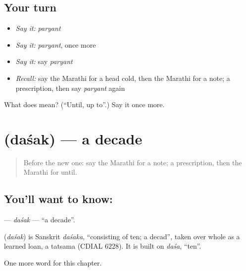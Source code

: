 \subsection*{Your turn}
\begin{itemize}
\raggedright
  \item \emph{Say it:} \emph{paryant}
  \item \emph{Say it:} \emph{paryant}, once more
  \item \emph{Say it:} say \emph{paryant}
  \item \emph{Recall:} say the Marathi for a head cold, then the Marathi for a note; a prescription, then say \emph{paryant} again
\end{itemize}

\begin{tcolorbox}[breakable,colback=teal!4,colframe=teal!35!black,title={Before you move on}]
What does  mean? (\textquotedblleft{}Until, up to\textquotedblright{}.) Say it once more.
\end{tcolorbox}
\section[\texorpdfstring{\mr{दशक} (daśak)}{दशक (daśak)}]{ (daśak) — a decade}

\label{lesson:MR-C201-dasak}



\begin{quote}
Before the new one: say the Marathi for a note; a prescription, then the Marathi for until.
\end{quote}

\subsection*{You'll want to know: }
\textbf{} — \emph{daśak} — \textquotedblleft{}a decade\textquotedblright{}.

\begin{cousinweb}
\textbf{} (\emph{daśak}) is Sanskrit \emph{daśaka}, \textquotedblleft{}consisting of ten; a decad\textquotedblright{}, taken over whole as a learned loan, a tatsama (CDIAL 6228). It is built on \emph{daśa}, \textquotedblleft{}ten\textquotedblright{}.
\end{cousinweb}

\begin{grammarlens}[title={What you've built}]
One more word for this chapter.
\end{grammarlens}


